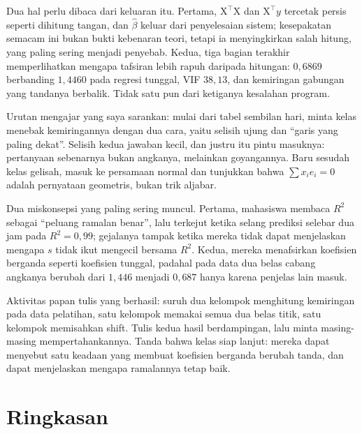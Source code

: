 Dua hal perlu dibaca dari keluaran itu. Pertama, $\mathrm{X}^{\top}\mathrm{X}$ dan
$\mathrm{X}^{\top}y$ tercetak persis seperti dihitung tangan, dan $\hat\beta$ keluar
dari penyelesaian sistem; kesepakatan semacam ini bukan bukti kebenaran teori, tetapi ia
menyingkirkan salah hitung, yang paling sering menjadi penyebab. Kedua, tiga bagian
terakhir memperlihatkan mengapa tafsiran lebih rapuh daripada hitungan: $0{,}6869$
berbanding $1{,}4460$ pada regresi tunggal, VIF $38{,}13$, dan kemiringan gabungan yang
tandanya berbalik. Tidak satu pun dari ketiganya kesalahan program.

\begin{untukdosen}
Urutan mengajar yang saya sarankan: mulai dari tabel sembilan hari, minta kelas menebak
kemiringannya dengan dua cara, yaitu selisih ujung dan ``garis yang paling dekat''.
Selisih kedua jawaban kecil, dan justru itu pintu masuknya: pertanyaan sebenarnya bukan
angkanya, melainkan goyangannya. Baru sesudah kelas gelisah, masuk ke persamaan normal
dan tunjukkan bahwa $\sum x_ie_i=0$ adalah pernyataan geometris, bukan trik aljabar.

Dua miskonsepsi yang paling sering muncul. Pertama, mahasiswa membaca $R^2$ sebagai
``peluang ramalan benar'', lalu terkejut ketika selang prediksi selebar dua jam pada
$R^2=0{,}99$; gejalanya tampak ketika mereka tidak dapat menjelaskan mengapa $s$ tidak
ikut mengecil bersama $R^2$. Kedua, mereka menafsirkan koefisien berganda seperti
koefisien tunggal, padahal pada data dua belas cabang angkanya berubah dari $1{,}446$
menjadi $0{,}687$ hanya karena penjelas lain masuk.

Aktivitas papan tulis yang berhasil: suruh dua kelompok menghitung kemiringan pada data
pelatihan, satu kelompok memakai semua dua belas titik, satu kelompok memisahkan shift.
Tulis kedua hasil berdampingan, lalu minta masing-masing mempertahankannya. Tanda bahwa
kelas siap lanjut: mereka dapat menyebut satu keadaan yang membuat koefisien berganda
berubah tanda, dan dapat menjelaskan mengapa ramalannya tetap baik.
\end{untukdosen}

\section{Ringkasan}

